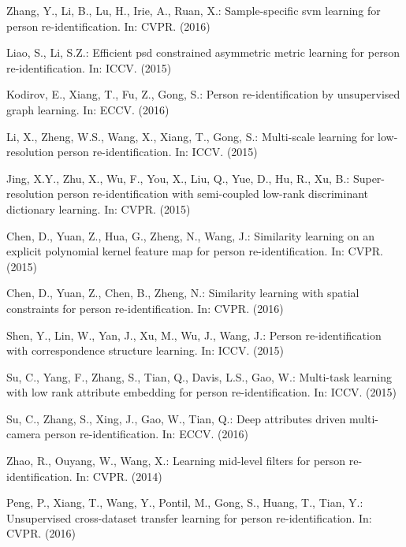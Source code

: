 \documentclass{llncs}
\begin{document}
\begin{thebibliography}{10}
Zhang, Y., Li, B., Lu, H., Irie, A., Ruan, X.:
\newblock Sample-specific svm learning for person re-identification.
\newblock In: CVPR. (2016)

Liao, S., Li, S.Z.:
\newblock Efficient psd constrained asymmetric metric learning for person
  re-identification.
\newblock In: ICCV. (2015)

Kodirov, E., Xiang, T., Fu, Z., Gong, S.:
\newblock Person re-identification by unsupervised  graph learning.
\newblock In: ECCV. (2016)

Li, X., Zheng, W.S., Wang, X., Xiang, T., Gong, S.:
\newblock Multi-scale learning for low-resolution person re-identification.
\newblock In: ICCV. (2015)

Jing, X.Y., Zhu, X., Wu, F., You, X., Liu, Q., Yue, D., Hu, R., Xu, B.:
\newblock Super-resolution person re-identification with semi-coupled low-rank
  discriminant dictionary learning.
\newblock In: CVPR. (2015)

Chen, D., Yuan, Z., Hua, G., Zheng, N., Wang, J.:
\newblock Similarity learning on an explicit polynomial kernel feature map for
  person re-identification.
\newblock In: CVPR. (2015)

Chen, D., Yuan, Z., Chen, B., Zheng, N.:
\newblock Similarity learning with spatial constraints for person
  re-identification.
\newblock In: CVPR. (2016)

Shen, Y., Lin, W., Yan, J., Xu, M., Wu, J., Wang, J.:
\newblock Person re-identification with correspondence structure learning.
\newblock In: ICCV. (2015)

Su, C., Yang, F., Zhang, S., Tian, Q., Davis, L.S., Gao, W.:
\newblock Multi-task learning with low rank attribute embedding for person
  re-identification.
\newblock In: ICCV. (2015)

Su, C., Zhang, S., Xing, J., Gao, W., Tian, Q.:
\newblock Deep attributes driven multi-camera person re-identification.
\newblock In: ECCV. (2016)

Zhao, R., Ouyang, W., Wang, X.:
\newblock Learning mid-level filters for person re-identification.
\newblock In: CVPR. (2014)

Peng, P., Xiang, T., Wang, Y., Pontil, M., Gong, S., Huang, T., Tian, Y.:
\newblock Unsupervised cross-dataset transfer learning for person
  re-identification.
\newblock In: CVPR. (2016)


\end{thebibliography}
\end{document}
